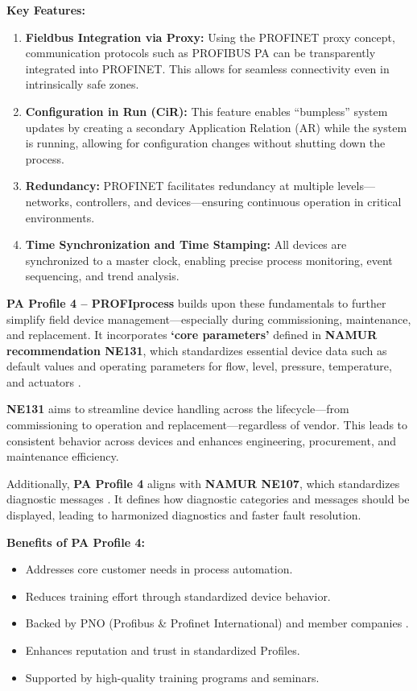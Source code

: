 \documentclass[conference]{IEEEtran}
\begin{document}
\textbf{Key Features:}
\begin{enumerate}
    \item \textbf{Fieldbus Integration via Proxy:} 
    Using the PROFINET proxy concept, communication protocols such as PROFIBUS PA can be transparently integrated into PROFINET. This allows for seamless connectivity even in intrinsically safe zones.

    \item \textbf{Configuration in Run (CiR):} 
    This feature enables “bumpless” system updates by creating a secondary Application Relation (AR) while the system is running, allowing for configuration changes without shutting down the process.

    \item \textbf{Redundancy:}
    PROFINET facilitates redundancy at multiple levels—networks, controllers, and devices—ensuring continuous operation in critical environments.

    \item \textbf{Time Synchronization and Time Stamping:}
    All devices are synchronized to a master clock, enabling precise process monitoring, event sequencing, and trend analysis.
\end{enumerate}

\textbf{PA Profile 4 – PROFIprocess} builds upon these fundamentals to further simplify field device management—especially during commissioning, maintenance, and replacement. It incorporates \textbf{‘core parameters’} defined in \textbf{NAMUR recommendation NE131}, which standardizes essential device data such as default values and operating parameters for flow, level, pressure, temperature, and actuators \cite{profinet_profiprocess}.

\textbf{NE131} aims to streamline device handling across the lifecycle—from commissioning to operation and replacement—regardless of vendor. This leads to consistent behavior across devices and enhances engineering, procurement, and maintenance efficiency.

Additionally, \textbf{PA Profile 4} aligns with \textbf{NAMUR NE107}, which standardizes diagnostic messages \cite{profinet_profiprocess}. It defines how diagnostic categories and messages should be displayed, leading to harmonized diagnostics and faster fault resolution.

\textbf{Benefits of PA Profile 4:}
\begin{itemize}
    \item Addresses core customer needs in process automation.
    \item Reduces training effort through standardized device behavior.
    \item Backed by PNO (Profibus \& Profinet International) and member companies \cite{profinet_profiprocess}.
    \item Enhances reputation and trust in standardized Profiles.
    \item Supported by high-quality training programs and seminars.
\end{itemize}
\end{document}
